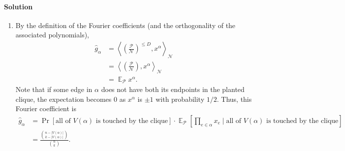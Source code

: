 \documentclass[11pt]{article}
\theoremstyle{definition}
\DeclareMathOperator{\E}{\mathbb{E}} %
\newcommand{\wh}[1]{\widehat{#1}}
\begin{document}
\paragraph{Solution}

\begin{enumerate}[label=(\alph*)]
  \item By the definition of the Fourier coefficients (and the orthogonality of the associated polynomials),
  \begin{align*}
    \wh{g}_\alpha &= \left\langle \left(\frac{\mathcal{P}}{\mathcal{N}}\right)^{\le D} , x^\alpha \right\rangle_{\mathcal{N}} \\
      &= \left\langle \left( \frac{\mathcal{P}}{\mathcal{N}} \right) , x^\alpha  \right\rangle_{\mathcal{N}} \\
      &= \E_{\mathcal{P}} x^\alpha.
  \end{align*}
  Note that if some edge in $\alpha$ does not have both its endpoints in the planted clique, the expectation becomes $0$ as $x^\alpha$ is $\pm 1$ with probability $1/2$. Thus, this Fourier coefficient is
  \begin{align*}
    \wh{g}_\alpha &= \Pr\left[ \text{all of $V(\alpha)$ is touched by the clique} \right] \cdot \E_{\mathcal{P}} \left[\prod_{e \in \alpha} x_e \mid \text{all of $V(\alpha)$ is touched by the clique}\right] \\
      &= \frac{\binom{n-|V(\alpha)|}{k-|V(\alpha)|}}{\binom{n}{k}}.
  \end{align*}


\end{enumerate}
\end{document}
